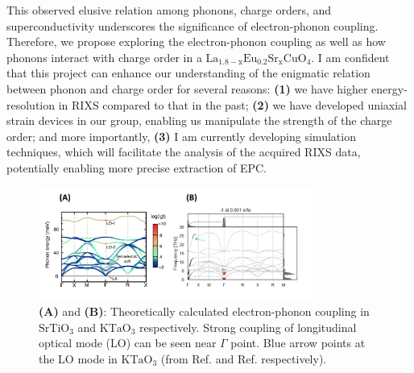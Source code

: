 \documentclass[11pt]{article}
\begin{document}
This observed elusive relation among phonons, charge orders, and superconductivity underscores the significance of electron-phonon coupling. 
Therefore, we propose exploring the electron-phonon coupling as well as how phonons interact with charge order in a $\mathrm{La_{1.8-x}Eu_{0.2}Sr_xCuO_{4}}$. 
I am confident that this project can enhance our understanding of the enigmatic relation between phonon and charge order for several reasons: 
\textbf{(1)} we have higher energy-resolution in RIXS compared to that in the past; 
\textbf{(2)} we have developed uniaxial strain devices in our group, enabling us manipulate the strength of the charge order; 
and more importantly, \textbf{(3)} I am currently developing simulation techniques, which will facilitate the analysis of the acquired RIXS data, potentially enabling more precise extraction of EPC.
\begin{figure}[!t]
    \centering
    \includegraphics[width=0.8\textwidth]{figures/new_second_figure.jpg}
    \caption{\textbf{(A)} and \textbf{(B)}: Theoretically calculated electron-phonon coupling in $\mathrm{SrTiO_3}$ and $\mathrm{KTaO_3}$ respectively. Strong coupling of longitudinal optical mode (LO) can be seen near $\Gamma$ point. Blue arrow points at the LO mode in  $\mathrm{KTaO_3}$ (from Ref.\cite{zhou_electron-phonon_2018} and Ref.\cite{esswein_first-principles_2023} respectively).}  
\end{figure}
\end{document}
